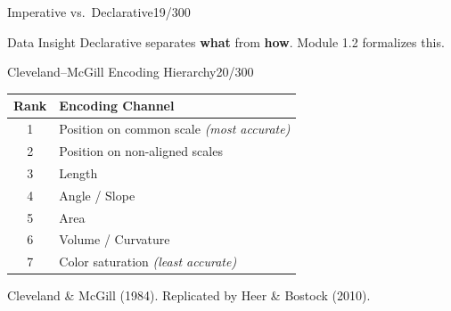 \documentclass[10pt]{beamer}
\newcommand{\smark}[1]{\hfill{\scriptsize\color{codegray}#1}}
\begin{document}
\begin{frame}{Imperative vs.\ Declarative}\smark{19/300}
\centering
{}
\vspace{0.3cm}
\begin{exampleblock}{Data Insight}
    \scriptsize Declarative separates \textbf{what} from \textbf{how}. Module 1.2 formalizes this.
\end{exampleblock}
\end{frame}

\begin{frame}{Cleveland--McGill Encoding Hierarchy}\smark{20/300}
\centering\small
\begin{tabular}{@{}cl@{}}
    \toprule
    \textbf{Rank} & \textbf{Encoding Channel} \\
    \midrule
    1 & Position on common scale \textit{(most accurate)} \\
    2 & Position on non-aligned scales \\
    3 & Length \\
    4 & Angle / Slope \\
    5 & Area \\
    6 & Volume / Curvature \\
    7 & Color saturation \textit{(least accurate)} \\
    \bottomrule
\end{tabular}
\vspace{0.2cm}

{\scriptsize Cleveland \& McGill (1984). Replicated by Heer \& Bostock (2010).}
\end{frame}
\end{document}
